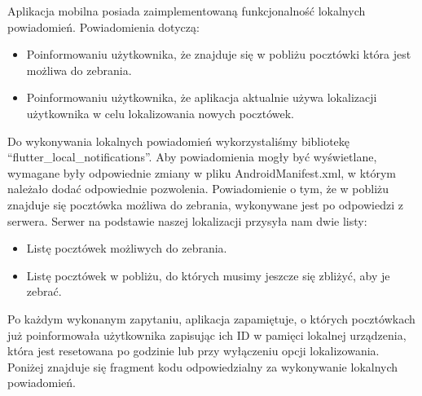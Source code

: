 \documentclass[a4paper,twoside,12pt]{book}
\begin{document}
Aplikacja mobilna posiada zaimplementowaną funkcjonalność lokalnych powiadomień. Powiadomienia dotyczą:
\begin{itemize}
    \item Poinformowaniu użytkownika, że znajduje się w pobliżu pocztówki która jest możliwa do zebrania. 
    \item Poinformowaniu użytkownika, że aplikacja aktualnie używa lokalizacji użytkownika w celu lokalizowania nowych pocztówek.
\end{itemize}
Do wykonywania lokalnych powiadomień wykorzystaliśmy bibliotekę ``flutter\_local\_notifications''. Aby powiadomienia mogły być wyświetlane, wymagane były odpowiednie zmiany w pliku AndroidManifest.xml, w którym należało dodać odpowiednie pozwolenia.
Powiadomienie o tym, że w pobliżu znajduje się pocztówka możliwa do zebrania, wykonywane jest po odpowiedzi z serwera. Serwer na podstawie naszej lokalizacji przysyła nam dwie listy:
\begin{itemize}
    \item Listę pocztówek możliwych do zebrania.
    \item Listę pocztówek w pobliżu, do których musimy jeszcze się zbliżyć, aby je zebrać.
\end{itemize}
Po każdym wykonanym zapytaniu, aplikacja zapamiętuje, o których pocztówkach już poinformowała użytkownika zapisując ich ID w pamięci lokalnej urządzenia, która jest resetowana po godzinie lub przy wyłączeniu opcji lokalizowania. Poniżej znajduje się fragment kodu odpowiedzialny za wykonywanie lokalnych powiadomień.
\end{document}
